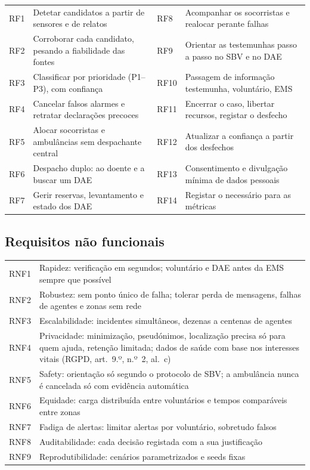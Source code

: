 \documentclass[10pt,a4paper]{article}
\begin{document}
\noindent\begin{tabularx}{\linewidth}{@{}lL@{\hspace{1.5em}}lL@{}}
\toprule
RF1 & Detetar candidatos a partir de sensores e de relatos & RF8 & Acompanhar os socorristas e realocar perante falhas \\
RF2 & Corroborar cada candidato, pesando a fiabilidade das fontes & RF9 & Orientar as testemunhas passo a passo no SBV e no DAE \\
RF3 & Classificar por prioridade (P1--P3), com confiança & RF10 & Passagem de informação testemunha, voluntário, EMS \\
RF4 & Cancelar falsos alarmes e retratar declarações precoces & RF11 & Encerrar o caso, libertar recursos, registar o desfecho \\
RF5 & Alocar socorristas e ambulâncias sem despachante central & RF12 & Atualizar a confiança a partir dos desfechos \\
RF6 & Despacho duplo: ao doente e a buscar um DAE & RF13 & Consentimento e divulgação mínima de dados pessoais \\
RF7 & Gerir reservas, levantamento e estado dos DAE & RF14 & Registar o necessário para as métricas \\
\bottomrule
\end{tabularx}

\subsection{Requisitos não funcionais}\label{sec:rnf}

\noindent\begin{tabularx}{\linewidth}{@{}lL@{}}
\toprule
RNF1 & Rapidez: verificação em segundos; voluntário e DAE antes da EMS sempre que possível \\
RNF2 & Robustez: sem ponto único de falha; tolerar perda de mensagens, falhas de agentes e zonas sem rede \\
RNF3 & Escalabilidade: incidentes simultâneos, dezenas a centenas de agentes \\
RNF4 & Privacidade: minimização, pseudónimos, localização precisa só para quem ajuda, retenção limitada; dados de saúde com base nos interesses vitais (RGPD, art.~9.º, n.º~2, al.~c) \\
RNF5 & Safety: orientação só segundo o protocolo de SBV; a ambulância nunca é cancelada só com evidência automática \\
RNF6 & Equidade: carga distribuída entre voluntários e tempos comparáveis entre zonas \\
RNF7 & Fadiga de alertas: limitar alertas por voluntário, sobretudo falsos \\
RNF8 & Auditabilidade: cada decisão registada com a sua justificação \\
RNF9 & Reprodutibilidade: cenários parametrizados e seeds fixas \\
\bottomrule
\end{tabularx}
\end{document}
